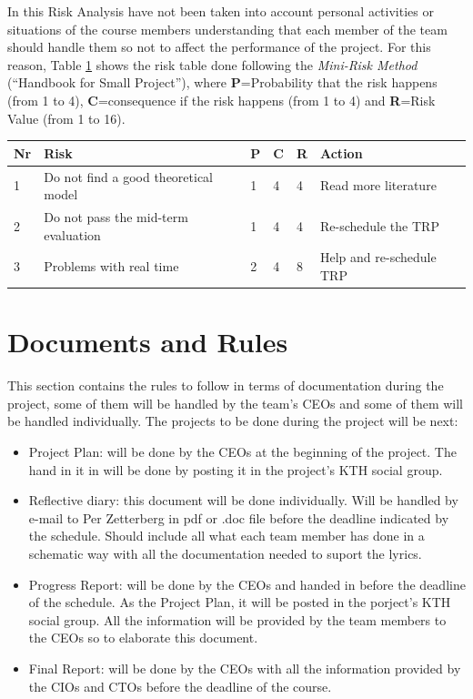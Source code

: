\documentclass[11pt]{article}
\begin{document}
In this Risk Analysis have not been taken into account personal activities or situations of the course members understanding that each member of the team should handle them so not to affect the performance of the project. For this reason, Table \ref{tablerisk} shows the risk table done following the \textit{Mini-Risk Method} (``Handbook for Small Project''), where \textbf{P}=Probability that the risk happens (from 1 to 4), \textbf{C}=consequence if the risk happens (from 1 to 4) and \textbf{R}=Risk Value (from 1 to 16).


\begin{table}[h]
\label{tablerisk}
\centering
\begin{tabular}{l| l| l| l| l| l}
 Nr &Risk  &P  &C  &R &Action  \\
 \hline
 1 & Do not find a good theoretical model & 1 & 4 & 4 & Read more literature\\
 2 & Do not pass the mid-term evaluation & 1 & 4 & 4 & Re-schedule the TRP\\
 3 & Problems with real time & 2 & 4 & 8 & Help and re-schedule TRP \\
\end{tabular}
\end{table}



\section{Documents and Rules}
This section contains the rules to follow in terms of documentation during the project, some of them will be handled by the team's CEOs and some of them will be handled individually. The projects to be done during the project will be next:

\begin{itemize}
\item Project Plan: will be done by the CEOs at the beginning of the project. The hand in it in will be done by posting it in the project's KTH social group.

\item Reflective diary: this document will be done individually. Will be handled by e-mail to Per Zetterberg in pdf or .doc file before the deadline indicated by the schedule. Should include all what each team member has done in a schematic way with all the documentation needed to suport the lyrics.

\item Progress Report: will be done by the CEOs and handed in before the deadline of the schedule. As the Project Plan, it will be posted in the porject's KTH social group.  All the information will be provided by the team members to the CEOs so to elaborate this document.

\item Final Report: will be done by the CEOs with all the information provided by the CIOs and CTOs before the deadline of the course.
\end{itemize}
\end{document}
